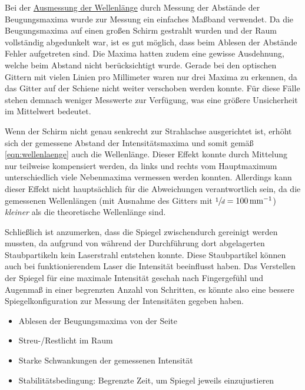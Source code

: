     Bei der \hyperref[sec:auswertung:wellenlaenge]{Ausmessung der Wellenlänge} durch Messung der Abstände der Beugungsmaxima wurde zur Messung ein einfaches Maßband verwendet.
    Da die Beugungsmaxima auf einen großen Schirm gestrahlt wurden und der Raum vollständig abgedunkelt war,
    ist es gut möglich,
    dass beim Ablesen der Abstände Fehler aufgetreten sind.
    Die Maxima hatten zudem eine gewisse Ausdehnung,
    welche beim Abstand nicht berücksichtigt wurde.
    Gerade bei den optischen Gittern mit vielen Linien pro Millimeter waren nur drei Maxima zu erkennen,
    da das Gitter auf der Schiene nicht weiter verschoben werden konnte.
    Für diese Fälle stehen demnach weniger Messwerte zur Verfügung,
    was eine größere Unsicherheit im Mittelwert bedeutet.

    Wenn der Schirm nicht genau senkrecht zur Strahlachse ausgerichtet ist,
    erhöht sich der gemessene Abstand der Intensitätsmaxima und somit gemäß \autoref{eqn:wellenlaenge} auch die Wellenlänge.
    Dieser Effekt konnte durch Mittelung nur teilweise kompensiert werden,
    da links und rechts vom Hauptmaximum unterschiedlich viele Nebenmaxima vermessen werden konnten.
    Allerdings kann dieser Effekt nicht hauptsächlich für die Abweichungen verantwortlich sein,
    da die gemessenen Wellenlängen (mit Ausnahme des Gitters mit $\sfrac{1}{d} = \SI[per-mode=reciprocal]{100}{\per\milli\meter}$)
    \textit{kleiner} als die theoretische Wellenlänge sind.


    Schließlich ist anzumerken,
    dass die Spiegel zwischendurch gereinigt werden mussten,
    da aufgrund von während der Durchführung dort abgelagerten Staubpartikeln kein Laserstrahl entstehen konnte.
    Diese Staubpartikel können auch bei funktionierendem Laser die Intensität beeinflusst haben.
    Das Verstellen der Spiegel für eine maximale Intensität geschah nach Fingergefühl und Augenmaß
    in einer begrenzten Anzahl von Schritten,
    es könnte also eine bessere Spiegelkonfiguration zur Messung der Intensitäten gegeben haben.

\begin{itemize}
    \item Ablesen der Beugungsmaxima von der Seite
    \item Streu-/Restlicht im Raum
    \item Starke Schwankungen der gemessenen Intensität
    \item Stabilitätsbedingung: Begrenzte Zeit, um Spiegel jeweils einzujustieren
\end{itemize}

